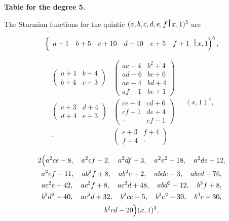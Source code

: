 \documentclass[11pt,a4paper]{book}
\begin{document}
\begin{center}
\bigskip
\noindent\textbf{Table for the degree 5.}

The Sturmian functions for the quintic $(a,b,c,d,e,f\,\raisebox{0.5ex}{\textbf{\textbar}}\,x,1)^5$ are

\[
\left\{
\begin{array}{cccccc}
a+1 & b+5 & c+10 & d+10 & e+5 & f+1
\end{array}
\,\raisebox{0.5ex}{\textbf{\textbar}}\,x,1\right)^5,
\]

\[
\begin{array}{cc}
\begin{pmatrix}
a+1 & b+4 \\
b+4 & c+3
\end{pmatrix} &
\begin{pmatrix}
ac-4 & b^2+4 \\
ad-6 & bc+6 \\
ae-4 & bd+4 \\
af-1 & be+1
\end{pmatrix} \\
\begin{pmatrix}
c+3 & d+4 \\
d+4 & e+3
\end{pmatrix} &
\begin{pmatrix}
ce-4 & cd+6 \\
cf-1 & de+4 \\
\cdot & ef-1
\end{pmatrix} \\
\cdot & \begin{pmatrix} e+3 & f+4 \\ f+4 & \cdot \end{pmatrix}
\end{array}
\quad
(x,1)^4,
\]

\begin{multline*}
2\Bigl(
a^2ce - 8,\quad a^2cf - 2,\quad a^2df + 3,\quad a^2e^2 + 18,\quad a^2de + 12,\\
a^2ef - 11,\quad ab^2f + 8,\quad ab^2e + 2,\quad abde - 3,\quad abcd - 76,\\
ac^2e - 42,\quad ac^2f + 8,\quad ac^2d + 48,\quad abd^2 - 12,\quad b^3f + 8,\\
b^2d^2 + 40,\quad ac^2d + 32,\quad b^2ce - 5,\quad b^2e^2 - 30,\quad b^3e + 30,\\
b^2cd - 20
\Bigr)(x,1)^3,
\end{multline*}


\end{center}
\end{document}
